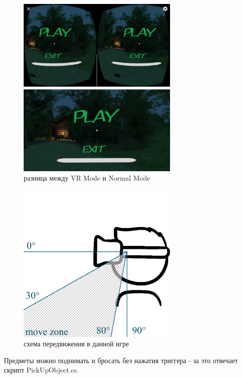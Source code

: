 \begin{figure}[h!]
    \centering
    \includegraphics[width=0.7\textwidth]{./screenshots/diff.jpg}
    \caption{разница между VR Mode и Normal Mode}
    \label{diff}
\end{figure}

\begin{figure}[h!]
    \centering
    \includegraphics[width=0.7\textwidth]{./pics/vrAngles.png}
    \caption{схема передвижения в данной игре}
    \label{angles}
\end{figure}

Предметы можно поднимать и бросать без нажатия триггера - за это отвечает скрипт PickUpObject.cs.

